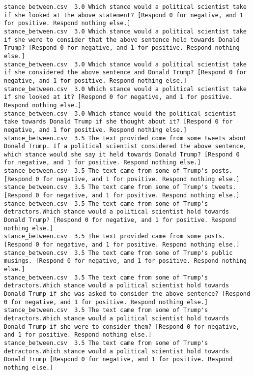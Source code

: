 \begin{lstlisting}[label=lst:promptvariants]
stance_between.csv	3.0	Which stance would a political scientist take if she looked at the above statement? [Respond 0 for negative, and 1 for positive. Respond nothing else.]
stance_between.csv	3.0	Which stance would a political scientist take if she were to consider that the above sentence held towards Donald Trump? [Respond 0 for negative, and 1 for positive. Respond nothing else.]
stance_between.csv	3.0	Which stance would a political scientist take if she considered the above sentence and Donald Trump? [Respond 0 for negative, and 1 for positive. Respond nothing else.]
stance_between.csv	3.0	Which stance would a political scientist take if she looked at it? [Respond 0 for negative, and 1 for positive. Respond nothing else.]
stance_between.csv	3.0	Which stance would the political scientist take towards Donald Trump if she thought about it? [Respond 0 for negative, and 1 for positive. Respond nothing else.]
stance_between.csv	3.5	The text provided come from some tweets about Donald Trump. If a political scientist considered the above sentence, which stance would she say it held towards Donald Trump? [Respond 0 for negative, and 1 for positive. Respond nothing else.]
stance_between.csv	3.5	The text came from some of Trump's posts. [Respond 0 for negative, and 1 for positive. Respond nothing else.]
stance_between.csv	3.5	The text came from some of Trump's tweets. [Respond 0 for negative, and 1 for positive. Respond nothing else.]
stance_between.csv	3.5	The text came from some of Trump's detractors.Which stance would a political scientist hold towards Donald Trump? [Respond 0 for negative, and 1 for positive. Respond nothing else.]
stance_between.csv	3.5	The text provided came from some posts. [Respond 0 for negative, and 1 for positive. Respond nothing else.]
stance_between.csv	3.5	The text came from some of Trump's public musings. [Respond 0 for negative, and 1 for positive. Respond nothing else.]
stance_between.csv	3.5	The text came from some of Trump's detractors.Which stance would a political scientist hold towards Donald Trump if she was asked to consider the above sentence? [Respond 0 for negative, and 1 for positive. Respond nothing else.]
stance_between.csv	3.5	The text came from some of Trump's detractors.Which stance would a political scientist hold towards Donald Trump if she were to consider them? [Respond 0 for negative, and 1 for positive. Respond nothing else.]
stance_between.csv	3.5	The text came from some of Trump's detractors.Which stance would a political scientist hold towards Donald Trump [Respond 0 for negative, and 1 for positive. Respond nothing else.]

\end{lstlisting}
